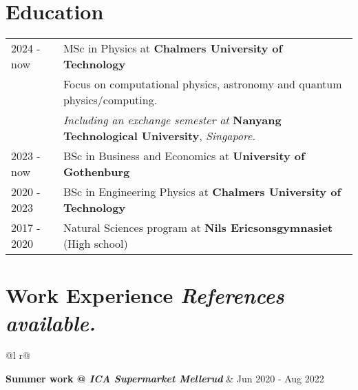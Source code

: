 \documentclass[a4paper,12pt]{article}
\begin{document}
\section{Education}
\begin{tabularx}{\linewidth}{@{}l X@{}}	
2024 - now &MSc in Physics at \textbf{Chalmers University of Technology} \hfill \\
&Focus on computational physics, astronomy and quantum physics/computing. \\
&\textit{Including an exchange semester at} \textbf{Nanyang Technological University}, \textit{Singapore.} \\[5pt] 

2023 - now &BSc in Business and Economics at \textbf{University of Gothenburg} \hfill \\[5pt] 

2020 - 2023 &BSc in Engineering Physics at \textbf{Chalmers University of Technology} \hfill \\[5pt] 

2017 - 2020 &Natural Sciences program at \textbf{Nils Ericsonsgymnasiet} (High school) \hfill \\ 
\end{tabularx}


\section{Work Experience \hfill \footnotesize\textsuperscript{\textcolor{red}{\faInfoCircle}} \textit{References available.}}
\begin{tabularx}{\linewidth}{ @{}l r@{} }

\textbf{Summer work @ \textit{ICA Supermarket Mellerud}}\textsuperscript{\textcolor{red}{\faInfoCircle}} & \hfill Jun 2020 - Aug 2022 \\[5pt]
 \\[10.75pt]
\end{tabularx}
\end{document}
